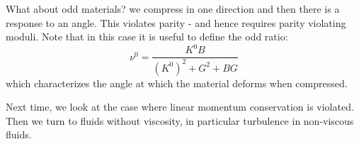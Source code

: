 What about odd materials? we compress in one direction and then there is a response to an angle. This violates parity - and hence requires parity violating moduli. Note that in this case it is useful to define the odd ratio:
\begin{equation}
    \nu^0 = \frac{K^0B}{(K^0)^2 + G^2 + BG}
\end{equation}
which characterizes the angle at which the material deforms when compressed.

Next time, we look at the case where linear momentum conservation is violated. Then we turn to fluids without viscosity, in particular turbulence in non-viscous fluids.